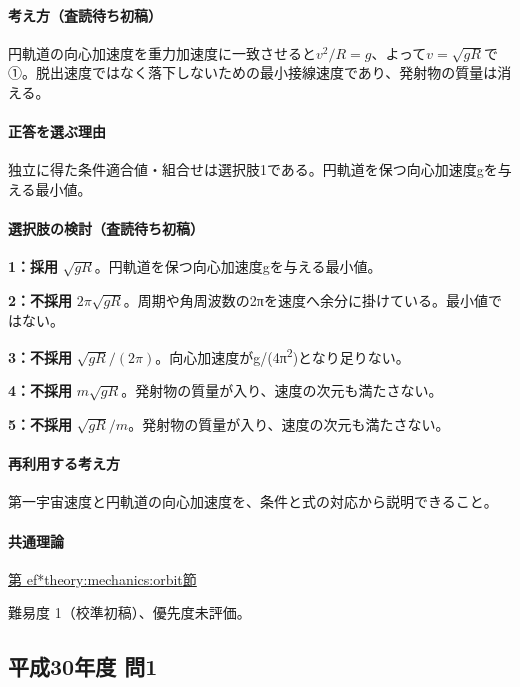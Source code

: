 \paragraph{考え方（査読待ち初稿）} 円軌道の向心加速度を重力加速度に一致させると\(v^2/R=g\)、よって\(v=\sqrt{gR}\)で①。脱出速度ではなく落下しないための最小接線速度であり、発射物の質量は消える。

\paragraph{正答を選ぶ理由} 独立に得た条件適合値・組合せは選択肢1である。円軌道を保つ向心加速度gを与える最小値。

\paragraph{選択肢の検討（査読待ち初稿）}

\noindent\textbf{1：採用} \(\sqrt{gR}\)。円軌道を保つ向心加速度gを与える最小値。\par

\noindent\textbf{2：不採用} \(2\pi\sqrt{gR}\)。周期や角周波数の2πを速度へ余分に掛けている。最小値ではない。\par

\noindent\textbf{3：不採用} \(\sqrt{gR}/(2\pi)\)。向心加速度がg/(4π\textsuperscript{2})となり足りない。\par

\noindent\textbf{4：不採用} \(m\sqrt{gR}\)。発射物の質量が入り、速度の次元も満たさない。\par

\noindent\textbf{5：不採用} \(\sqrt{gR}/m\)。発射物の質量が入り、速度の次元も満たさない。\par

\paragraph{再利用する考え方} 第一宇宙速度と円軌道の向心加速度を、条件と式の対応から説明できること。

\paragraph{共通理論} \hyperref[theory:mechanics:orbit]{第
ef*{theory:mechanics:orbit}節}

\par 難易度 1（校準初稿）、優先度未評価。

\subsection{平成30年度 問1}
\label{q:h30-reg-applied-01}

